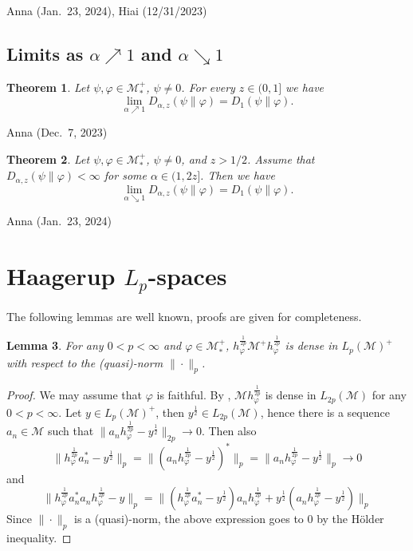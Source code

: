 \documentclass[12pt]{article}
\newtheorem{theorem}{Theorem}[section]
\newtheorem{lemma}[theorem]{Lemma}
\theoremstyle{definition}
\theoremstyle{remark}
\numberwithin{equation}{section}
\def\Me{\mathcal M}
\def\ffi{\varphi}
\begin{document}
{\color{magenta}Anna (Jan.\ 23, 2024), Hiai (12/31/2023)}

\subsection{Limits as $\alpha\nearrow1$ and $\alpha\searrow1$}

\begin{theorem}
Let $\psi,\ffi\in\Me_*^+$, $\psi\ne0$. For every $z\in(0,1]$ we have
\[
\lim_{\alpha\nearrow1}D_{\alpha,z}(\psi\|\ffi)=D_1(\psi\|\ffi).
\]
\end{theorem}
{\color{magenta}Anna (Dec.\ 7, 2023)}

\begin{theorem}
Let $\psi,\ffi\in\Me_*^+$, $\psi\ne0$, and $z>1/2$. Assume that $D_{\alpha,z}(\psi\|\ffi)<\infty$ for some
$\alpha\in(1,2z]$. Then we have
\[
\lim_{\alpha\searrow1}D_{\alpha,z}(\psi\|\ffi)=D_1(\psi\|\ffi).
\]
\end{theorem}
{\color{magenta}Anna (Jan.\ 23, 2024)}


\appendix

\section{Haagerup  $L_p$-spaces}\label{app:lp}


The following lemmas are well known, proofs are given for completeness.

\begin{lemma}\label{lemma:cone} For any $0<p<\infty$ and $\varphi\in \Me_*^+$, 
$h_\varphi^{\frac1{2p}}\Me^+h_\varphi^{\frac1{2p}}$ is dense in $L_p(\Me)^+$ with respect
to the (quasi)-norm $\|\cdot\|_p$.

\end{lemma}

\begin{proof} We may assume that $\varphi$ is faithful. By \cite[Lemma 1.1]{junge2003noncommutative}, $\Me
h_\varphi^{\frac1{2p}}$ is dense in $L_{2p}(\Me)$ for any $0<p<\infty$. Let $y\in L_p(\Me)^+$, then
$y^{\frac12}\in L_{2p}(\Me)$, hence there is a sequence $a_n\in \Me$ such that
$\|a_nh^{\frac1{2p}}_\varphi-y^{\frac12}\|_{2p}\to 0$. Then also 
\[
\|h^{\frac1{2p}}_\varphi
a_n^*-y^{\frac12}\|_p=\|(a_nh^{\frac1{2p}}_\varphi-y^{\frac12})^*\|_p=\|a_nh^{\frac1{2p}}_\varphi-y^{\frac12}\|_p\to 0
\]
and 
\[
\|h^{\frac1{2p}}_\varphi a_n^*a_nh^{\frac1{2p}}_\varphi-y\|_p=\|(h^{\frac1{2p}}_\varphi
a_n^*-y^{\frac12})a_nh^{\frac1{2p}}_\varphi+y^{\frac12}(a_nh^{\frac1{2p}}_\varphi-y^{\frac12})\|_p
\]
Since $\|\cdot\|_p$ is a (quasi)-norm, the above expression goes to 0 by the H\"older
inequality.



\end{proof}
\end{document}
